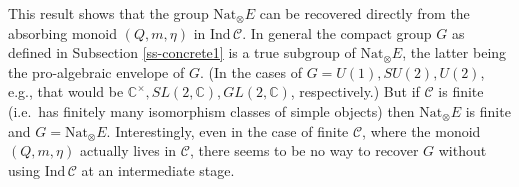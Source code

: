 \documentclass[11pt]{article}
\theoremstyle{definition}
\theoremstyle{definition}
\theoremstyle{remark}
\def\2#1{{\mathcal #1}}
\def\7#1{{\mathbb #1}}
\newcommand{\Nat}{\mathrm{Nat}}
\begin{document}
\brem This result shows that the group $\mathrm{Nat}_\otimes E$ can be
recovered directly from the absorbing monoid $(Q,m,\eta)$ in
$\mathrm{Ind}\,\2C$. In general the compact group $G$ as defined in
Subsection \ref{ss-concrete1} is a true subgroup of
$\mathrm{Nat}_\otimes E$, the latter being the pro-algebraic envelope
of $G$. (In the cases of $G=U(1), SU(2), U(2)$, e.g., that would be
$\7C^\times, SL(2,\7C), GL(2,\7C)$, respectively.) But if $\2C$ is
finite (i.e.\ has finitely many isomorphism classes of simple objects)
then $\Nat_\otimes E$ is finite and $G=\Nat_\otimes E$.
Interestingly, even in the case of finite $\2C$, where the monoid
$(Q,m,\eta)$ actually lives in $\2C$, there seems to be no way to
recover $G$ without using $\mathrm{Ind}\,\2C$ at an intermediate
stage.  \erem

 




\end{document}
